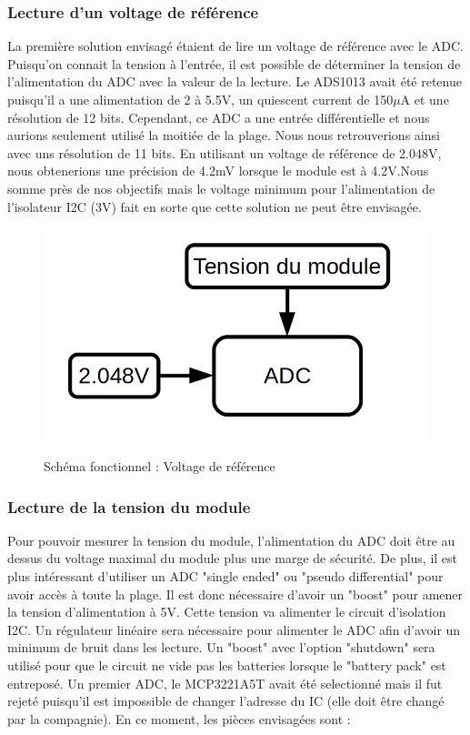 				\subsubsection{Lecture d'un voltage de référence}
					La première solution envisagé étaient de lire un voltage de référence avec le ADC. Puisqu'on connait la tension à l'entrée, il est possible de déterminer la tension de l'alimentation du ADC avec la valeur de la lecture. Le ADS1013 avait été retenue puisqu'il a une alimentation de 2 à 5.5V, un quiescent current de 150$\mu$A et une résolution de 12 bits. Cependant, ce ADC a une entrée différentielle et nous aurions seulement utilisé la moitiée de la plage. Nous nous retrouverions ainsi avec uns résolution de 11 bits. En utilisant un voltage de référence de 2.048V, nous obtenerions une précision de 4.2mV lorsque le module est à 4.2V.Nous somme près de nos objectifs mais le voltage minimum pour l'alimentation de l'isolateur I2C (3V) fait en sorte que cette solution ne peut être envisagée.
					\begin{figure}[h]
						\centering
						\includegraphics[scale=0.3]{./Lecture/images/Voltage_reference} \\ \vspace{0cm}
						\caption{Schéma fonctionnel : Voltage de référence }
					\end{figure}

				\newpage
				\subsubsection{Lecture de la tension du module}
					Pour pouvoir mesurer la tension du module, l'alimentation du ADC doit être au dessus du voltage maximal du module plus une marge de sécurité. De plus, il est plus intéressant d'utiliser un ADC "single ended" ou "pseudo differential" pour avoir accès à toute la plage. Il est donc nécessaire d'avoir un "boost" pour amener la tension d'alimentation à 5V. Cette tension va alimenter le circuit d'isolation I2C. Un régulateur linéaire sera nécessaire pour alimenter le ADC afin d'avoir un minimum de bruit dans les lecture. Un "boost" avec l'option "shutdown" sera utilisé pour que le circuit ne vide pas les batteries lorsque le "battery pack" est entreposé. Un premier ADC, le MCP3221A5T avait été selectionné mais il fut rejeté puisqu'il est impossible de changer l'adresse du IC (elle doit être changé par la compagnie). En ce moment, les pièces envisagées sont :
					

